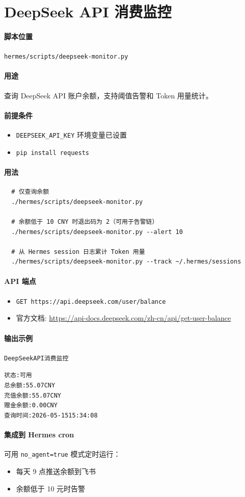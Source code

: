\section{DeepSeek API 消费监控}

\paragraph{脚本位置} \texttt{hermes/scripts/deepseek-monitor.py}

\paragraph{用途} 查询 DeepSeek API 账户余额，支持阈值告警和 Token 用量统计。

\paragraph{前提条件}
\begin{itemize}
  \item \texttt{DEEPSEEK\_API\_KEY} 环境变量已设置
  \item \texttt{pip install requests}
\end{itemize}

\paragraph{用法}
\begin{verbatim}
  # 仅查询余额
  ./hermes/scripts/deepseek-monitor.py

  # 余额低于 10 CNY 时退出码为 2（可用于告警链）
  ./hermes/scripts/deepseek-monitor.py --alert 10

  # 从 Hermes session 日志累计 Token 用量
  ./hermes/scripts/deepseek-monitor.py --track ~/.hermes/sessions
\end{verbatim}

\paragraph{API 端点}
\begin{itemize}
  \item \texttt{GET https://api.deepseek.com/user/balance}
  \item 官方文档: \url{https://api-docs.deepseek.com/zh-cn/api/get-user-balance}
\end{itemize}

\paragraph{输出示例}
\begin{alltt}

    DeepSeek API 消费监控

    状态:        可用
    总余额:     55.07 CNY
    充值余额:   55.07 CNY
    赠金余额:   0.00 CNY
    查询时间:   2026-05-15 15:34:08

\end{alltt}

\paragraph{集成到 Hermes cron} 可用 \texttt{no\_agent=true} 模式定时运行：
\begin{itemize}
  \item 每天 9 点推送余额到飞书
  \item 余额低于 10 元时告警
\end{itemize}
